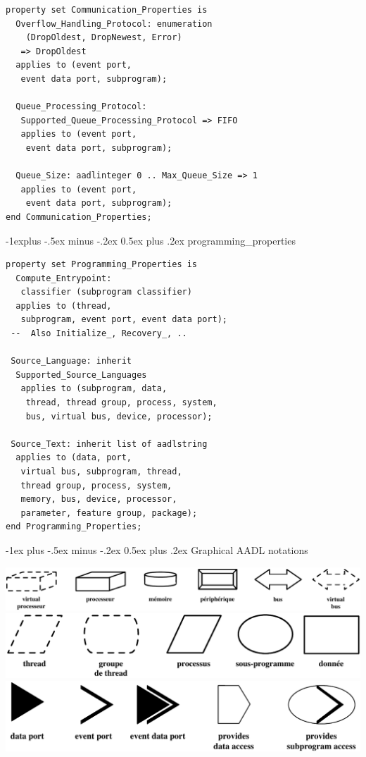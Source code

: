 \documentclass[10pt,landscape,letterpaper]{article}
\makeatletter
\renewcommand{\section}{\@startsection{section}{1}{0mm}%
                                {-1ex plus -.5ex minus -.2ex}%
                                {0.5ex plus .2ex}%
                                {\normalfont\large\bfseries}}
\renewcommand{\subsection}{\@startsection{subsection}{2}{0mm}%
                                {-1explus -.5ex minus -.2ex}%
                                {0.5ex plus .2ex}%
                                {\normalfont\normalsize\bfseries}}
\makeatother
\begin{document}
\begin{multicols}{3}
{\scriptsize
\begin{lstlisting}[language=aadl]
property set Communication_Properties is
  Overflow_Handling_Protocol: enumeration
    (DropOldest, DropNewest, Error)
   => DropOldest
  applies to (event port,
   event data port, subprogram);

  Queue_Processing_Protocol:
   Supported_Queue_Processing_Protocol => FIFO
   applies to (event port,
    event data port, subprogram);

  Queue_Size: aadlinteger 0 .. Max_Queue_Size => 1
   applies to (event port,
    event data port, subprogram);
end Communication_Properties;
\end{lstlisting}
}
\subsection{programming\_properties}

{\scriptsize
\begin{lstlisting}[language=aadl]
property set Programming_Properties is
  Compute_Entrypoint:
   classifier (subprogram classifier)
  applies to (thread,
   subprogram, event port, event data port);
 --  Also Initialize_, Recovery_, ..

 Source_Language: inherit
  Supported_Source_Languages
   applies to (subprogram, data,
    thread, thread group, process, system,
    bus, virtual bus, device, processor);

 Source_Text: inherit list of aadlstring
  applies to (data, port,
   virtual bus, subprogram, thread,
   thread group, process, system,
   memory, bus, device, processor,
   parameter, feature group, package);
end Programming_Properties;
\end{lstlisting}
}


\section{Graphical AADL notations}

\begin{center}
\includegraphics[width=.25\textwidth]{aadl-lang-hard.pdf}
\includegraphics[width=.25\textwidth]{aadl-lang-soft.pdf}
\includegraphics[width=.25\textwidth]{aadl-lang-itf.pdf}
\end{center}


\end{multicols}
\end{document}
